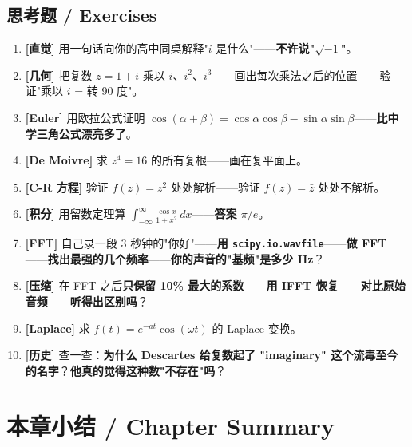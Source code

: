 \subsection{思考题 / Exercises}

\begin{enumerate}
\item \textbf{[直觉]} 用一句话向你的高中同桌解释"$i$ 是什么"——\textbf{不许说"$\sqrt{-1}$"}。
\item \textbf{[几何]} 把复数 $z = 1 + i$ 乘以 $i$、$i^2$、$i^3$——画出每次乘法之后的位置——验证"乘以 $i$ = 转 90 度"。
\item \textbf{[Euler]} 用欧拉公式证明 $\cos(\alpha+\beta) = \cos\alpha\cos\beta - \sin\alpha\sin\beta$——\textbf{比中学三角公式漂亮多了}。
\item \textbf{[De Moivre]} 求 $z^4 = 16$ 的所有复根——画在复平面上。
\item \textbf{[C-R 方程]} 验证 $f(z) = z^2$ 处处解析——验证 $f(z) = \bar z$ 处处不解析。
\item \textbf{[积分]} 用留数定理算 $\int_{-\infty}^{\infty} \frac{\cos x}{1+x^2}\, dx$——\textbf{答案 $\pi/e$}。
\item \textbf{[FFT]} 自己录一段 3 秒钟的"你好"——\textbf{用 \texttt{scipy.io.wavfile}}——\textbf{做 FFT}——\textbf{找出最强的几个频率}——\textbf{你的声音的"基频"是多少 Hz}？
\item \textbf{[压缩]} 在 FFT 之后\textbf{只保留 10\% 最大的系数}——\textbf{用 IFFT 恢复}——\textbf{对比原始音频}——\textbf{听得出区别吗}？
\item \textbf{[Laplace]} 求 $f(t) = e^{-at}\cos(\omega t)$ 的 Laplace 变换。
\item \textbf{[历史]} 查一查：\textbf{为什么 Descartes 给复数起了 "imaginary" 这个流毒至今的名字}？\textbf{他真的觉得这种数"不存在"吗}？
\end{enumerate}

\section{本章小结 / Chapter Summary}

